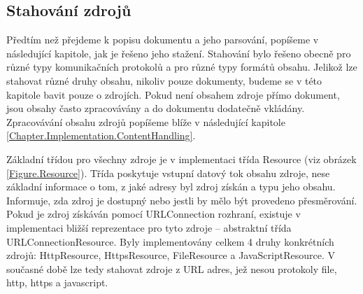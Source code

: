 \subsection{Stahování zdrojů}
\label{Chapter.Implementation.DownloadingResources}

Předtím než přejdeme k popisu dokumentu a jeho parsování, popíšeme v následující kapitole, jak je řešeno jeho stažení. Stahování bylo řešeno obecně pro různé typy komunikačních protokolů a pro různé typy formátů obsahu. Jelikož lze stahovat různé druhy obsahu, nikoliv pouze dokumenty, budeme se v této kapitole bavit pouze o zdrojích. Pokud není obsahem zdroje přímo dokument, jsou obsahy často zpracovávány a do dokumentu dodatečně vkládány. Zpracovávání obsahu zdrojů popíšeme blíže v následující kapitole \ref{Chapter.Implementation.ContentHandling}.

Základní třídou pro všechny zdroje je v implementaci třída Resource (viz obrázek \ref{Figure.Resource}). Třída poskytuje vstupní datový tok obsahu zdroje, nese základní informace o tom, z jaké adresy byl zdroj získán a typu jeho obsahu. Informuje, zda zdroj je dostupný nebo jestli by mělo být provedeno přesměrování. Pokud je zdroj získáván pomocí URLConnection rozhraní, existuje v implementaci bližší reprezentace pro tyto zdroje -- abstraktní třída URLConnectionResource. Byly implementovány celkem 4 druhy konkrétních zdrojů: HttpResource, HttpsResource, FileResource a JavaScriptResource. V současné době lze tedy stahovat zdroje z URL adres, jež nesou protokoly file, http, https a javascript.

